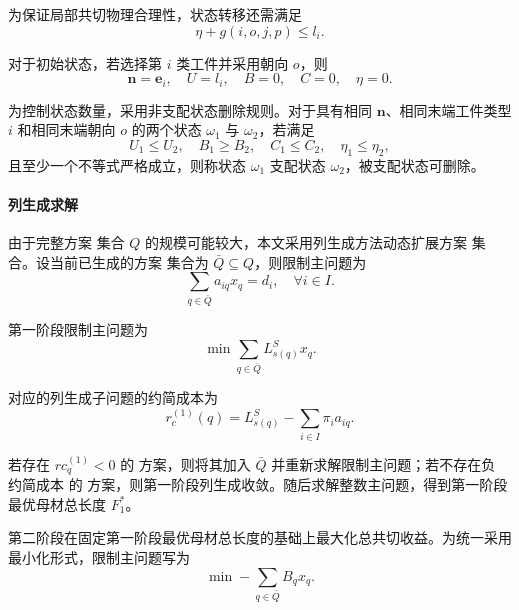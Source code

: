 \documentclass[UTF8]{ctexart}
\begin{document}
为保证局部共切物理合理性，状态转移还需满足
\begin{equation}
\eta+g(i,o,j,p)\leq l_i.
\label{eq:p3_eta_limit}
\end{equation}

对于初始状态，若选择第 $i$ 类工件并采用朝向 $o$，则
\begin{equation}
\boldsymbol{n}=\boldsymbol{e}_i,\quad
U=l_i,\quad
B=0,\quad
C=0,\quad
\eta=0.
\label{eq:p3_init_state}
\end{equation}

为控制状态数量，采用非支配状态删除规则。对于具有相同 $\boldsymbol{n}$、相同末端工件类型 $i$ 和相同末端朝向 $o$ 的两个状态 $\omega_1$ 与 $\omega_2$，若满足
\begin{equation}
U_1\leq U_2,\quad
B_1\geq B_2,\quad
C_1\leq C_2,\quad
\eta_1\leq \eta_2,
\label{eq:p3_dom_cond}
\end{equation}
且至少一个不等式严格成立，则称状态 $\omega_1$ 支配状态 $\omega_2$，被支配状态可删除。

\paragraph{列生成求解}

由于完整方案 集合 $Q$ 的规模可能较大，本文采用列生成方法动态扩展方案 集合。设当前已生成的方案 集合为 $\bar Q\subseteq Q$，则限制主问题为
\begin{equation}
\sum_{q\in \bar Q}a_{iq}x_q=d_i,
\quad \forall i\in I.
\label{eq:p3_master_demand}
\end{equation}

第一阶段限制主问题为
\begin{equation}
\min \sum_{q\in \bar Q}L_{s(q)}^Sx_q.
\label{eq:p3_master_phase1}
\end{equation}

对应的列生成子问题的约简成本为
\begin{equation}
r_c^{(1)}(q)=L_{s(q)}^S-\sum_{i\in I}\pi_i a_{iq}.
\label{eq:rc1}
\end{equation}

若存在 $rc_q^{(1)}<0$ 的 方案，则将其加入 $\bar Q$ 并重新求解限制主问题；若不存在负 约简成本 的 方案，则第一阶段列生成收敛。随后求解整数主问题，得到第一阶段最优母材总长度 $F_1^*$。

第二阶段在固定第一阶段最优母材总长度的基础上最大化总共切收益。为统一采用最小化形式，限制主问题写为
\begin{equation}
\min -\sum_{q\in \bar Q}B_qx_q.
\label{eq:p3_master_phase2}
\end{equation}
\end{document}
